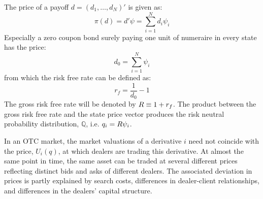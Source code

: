 \documentclass[../main.tex]{subfiles}
\begin{document}
        The price of a payoff $d=\left(d_{1}, \dots, d_{N}\right)'$ is given as:
            \begin{equation}
                \pi(d) = d'\psi = \sum_{i=1}^{N} d_{i}\psi_{i}
            \end{equation}
        Especially a zero coupon bond surely paying one unit of numeraire in every state has the price:
            \begin{equation}
                d_{0} = \sum_{i=1}^{N} \psi_{i}
            \end{equation}
        from which the risk free rate can be defined as:
            \begin{equation}
                r_{f} = \frac{1}{d_{0}} - 1
            \end{equation}
        The gross risk free rate will be denoted by $R \equiv 1 + r_{f}$.
        The product between the gross risk free rate and the state price vector produces the risk neutral probability distribution, $\mathbb{Q}$, i.e. $q_{i} = R\psi_{i}$.

        In an OTC market, the market valuations of a derivative $i$ need not coincide with the price, $U_{i}(q)$, at which dealers are trading this derivative.
        At almost the same point in time, the same asset can be traded at several different prices reflecting distinct bids and asks of different dealers.
        The associated deviation in prices is partly explained by search costs, differences in dealer-client relationships, and differences in the dealers' capital structure.
\end{document}
